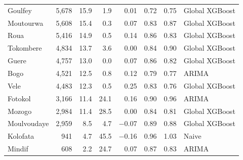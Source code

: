 \begin{table}[!htbp]
\begin{tabular}{@{}lrrrrrrl@{}}
Goulfey & 5,678 & 15.9 & 1.9 & 0.01 & 0.72 & 0.75 & Global XGBoost \\
Moutourwa & 5,608 & 15.4 & 0.3 & 0.07 & 0.83 & 0.87 & Global XGBoost \\
Roua & 5,416 & 14.9 & 0.5 & 0.14 & 0.86 & 0.83 & Global XGBoost \\
Tokombere & 4,834 & 13.7 & 3.6 & 0.00 & 0.84 & 0.90 & Global XGBoost \\
Guere & 4,757 & 13.0 & 0.0 & 0.07 & 0.86 & 0.82 & Global XGBoost \\
Bogo & 4,521 & 12.5 & 0.8 & 0.12 & 0.79 & 0.77 & ARIMA \\
Vele & 4,483 & 12.3 & 0.5 & 0.25 & 0.83 & 0.76 & Global XGBoost \\
Fotokol & 3,166 & 11.4 & 24.1 & 0.16 & 0.90 & 0.96 & ARIMA \\
Mozogo & 2,984 & 11.4 & 28.5 & 0.00 & 0.84 & 0.81 & Global XGBoost \\
Moulvoudaye & 2,959 & 8.5 & 4.7 & $-$0.07 & 0.89 & 0.88 & Global XGBoost \\
Kolofata & 941 & 4.7 & 45.5 & $-$0.16 & 0.96 & 1.03 & Naive \\
Mindif & 608 & 2.2 & 24.7 & 0.07 & 0.87 & 0.83 & ARIMA \\
\bottomrule\end{tabular}
\end{table}
